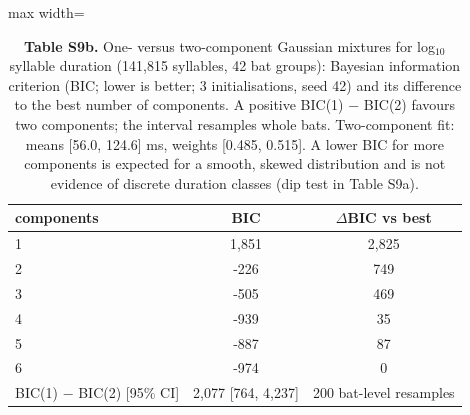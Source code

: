 \begin{table}[htbp]\centering\scriptsize
\caption{\textbf{Table S9b.} One- versus two-component Gaussian mixtures for log$_{10}$ syllable duration (141,815 syllables, 42 bat groups): Bayesian information criterion (BIC; lower is better; 3 initialisations, seed 42) and its difference to the best number of components. A positive BIC(1) $-$ BIC(2) favours two components; the interval resamples whole bats. Two-component fit: means [56.0, 124.6] ms, weights [0.485, 0.515]. A lower BIC for more components is expected for a smooth, skewed distribution and is not evidence of discrete duration classes (dip test in Table S9a).}\label{tab:S9b}
\begin{adjustbox}{max width=\linewidth}
\begin{tabular}{lcc}
\toprule
components & BIC & $\Delta$BIC vs best \\
\midrule
1 & 1,851 & 2,825 \\
2 & -226 & 749 \\
3 & -505 & 469 \\
4 & -939 & 35 \\
5 & -887 & 87 \\
6 & -974 & 0 \\
BIC(1) $-$ BIC(2) [95\% CI] & 2,077 [764, 4,237] & 200 bat-level resamples \\
\bottomrule
\end{tabular}
\end{adjustbox}
\end{table}
